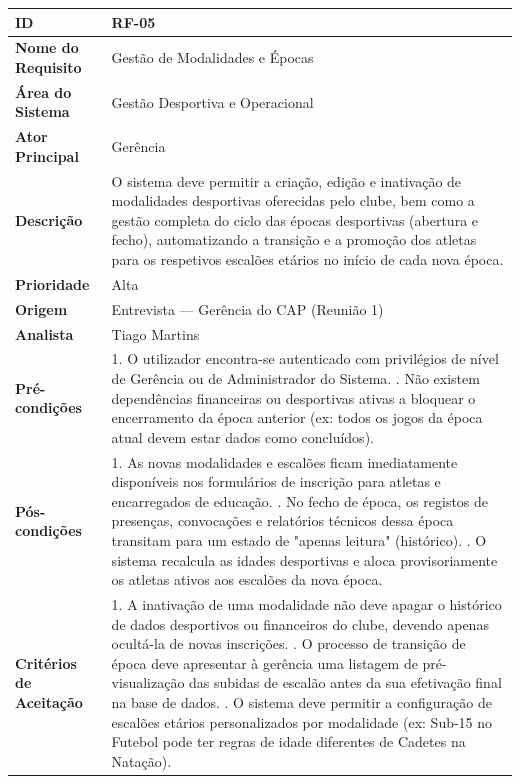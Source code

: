 {\begin{xltabular}{\textwidth}{|l|X|}
\textbf{ID} & RF-05 \\ \hline
\textbf{Nome do Requisito} & Gestão de Modalidades e Épocas \\ \hline
\textbf{Área do Sistema} & Gestão Desportiva e Operacional \\ \hline
\textbf{Ator Principal} & Gerência \\ \hline
\textbf{Descrição} & O sistema deve permitir a criação, edição e inativação de modalidades desportivas oferecidas pelo clube, bem como a gestão completa do ciclo das épocas desportivas (abertura e fecho), automatizando a transição e a promoção dos atletas para os respetivos escalões etários no início de cada nova época. \\ \hline
\textbf{Prioridade} & Alta \\ \hline
\textbf{Origem} & Entrevista --- Gerência do CAP (Reunião 1) \\ \hline
\textbf{Analista} & Tiago Martins \\ \hline
\textbf{Pré-condições} & 1. O utilizador encontra-se autenticado com privilégios de nível de Gerência ou de Administrador do Sistema. . Não existem dependências financeiras ou desportivas ativas a bloquear o encerramento da época anterior (ex: todos os jogos da época atual devem estar dados como concluídos). \\ \hline
\textbf{Pós-condições} & 1. As novas modalidades e escalões ficam imediatamente disponíveis nos formulários de inscrição para atletas e encarregados de educação. . No fecho de época, os registos de presenças, convocações e relatórios técnicos dessa época transitam para um estado de "apenas leitura" (histórico). . O sistema recalcula as idades desportivas e aloca provisoriamente os atletas ativos aos escalões da nova época. \\ \hline
\textbf{Critérios de Aceitação} & 1. A inativação de uma modalidade não deve apagar o histórico de dados desportivos ou financeiros do clube, devendo apenas ocultá-la de novas inscrições. . O processo de transição de época deve apresentar à gerência uma listagem de pré-visualização das subidas de escalão antes da sua efetivação final na base de dados. . O sistema deve permitir a configuração de escalões etários personalizados por modalidade (ex: Sub-15 no Futebol pode ter regras de idade diferentes de Cadetes na Natação). \\
\end{xltabular}
}


